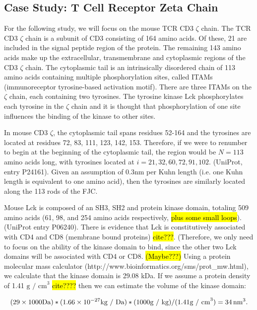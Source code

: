 \documentclass[../AdvancementSummary.tex]{subfiles}
\begin{document}
\subsection{Case Study: T Cell Receptor Zeta Chain}
\label{sec:ModelDevsubsec:TCR}
For the following study, we will focus on the mouse TCR CD3 $\zeta$ chain. The TCR CD3 $\zeta$ chain is a subunit of CD3 consisting of 164 amino acids.  Of these, 21 are included in the signal peptide region of the protein.  The remaining 143 amino acids make up the extracellular, transmembrane and cytoplasmic regions of the CD3 $\zeta$ chain.  The cytoplasmic tail is an intrinsically disordered chain of 113 amino acids containing multiple phosphorylation sites, called ITAMs (immunoreceptor tyrosine-based activation motif). There are three ITAMs on the $\zeta$ chain, each containing two tyrosines. The tyrosine kinase Lck phosphorylates each tyrosine in the $\zeta$ chain and it is thought that phosphorylation of one site influences the binding of the kinase to other sites.  

In mouse CD3 $\zeta$, the cytoplasmic tail spans residues 52-164 and the tyrosines are located at residues 72, 83, 111, 123, 142, 153.  Therefore, if we were to renumber to begin at the beginning of the cytoplasmic tail, the region would be $N=113$ amino acids long, with tyrosines located at $i= 21, 32, 60, 72, 91, 102$.  (UniProt, entry P24161). Given an assumption of 0.3nm per Kuhn length (i.e. one Kuhn length is equivalent to one amino acid), then the tyrosines are similarly located along the 113 rods of the FJC.

Mouse Lck is composed of an SH3, SH2 and protein kinase domain, totaling 509 amino acids (61, 98, and 254 amino acids respectively, \hl{plus some small loops}). (UniProt entry P06240). There is evidence that Lck is constitutively associated with CD4 and CD8 (membrane bound proteins) \hl{cite???}.  (Therefore, we only need to focus on the ability of the kinase domain to bind, since the other two Lck domains will be associated with CD4 or CD8. \hl{(Maybe???)} Using a protein molecular mass calculator (http://www.bioinformatics.org/sms/prot\_mw.html), we calculate that the kinase domain is 29.08 kDa.  If we assume a protein density of 1.41 $\mbox{g / cm}^3$ \hl{cite????} then we can estimate the volume of the kinase domain:

\begin{equation*}
(29 \times 1000 \mbox{Da}) * (1.66\times10^{-27} \mbox{kg / Da}) * (1000 \mbox{g / kg}) / (1.41 \mbox{g / cm}^3) = 34 \,\mbox{nm}^3.
\end{equation*}
\end{document}
